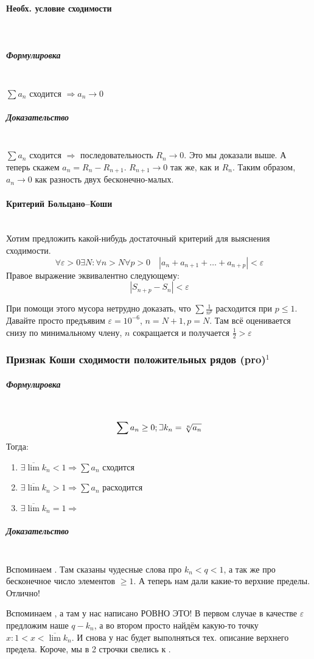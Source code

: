 \documentclass{article}
\def\letus{%
\mathord{\setbox0=\hbox{$\exists$}%
         \hbox{\kern 0.125\wd0%
               \vbox to \ht0{%
                  \hrule width 0.75\wd0%
                  \vfill%
                  \hrule width 0.75\wd0}%
               \vrule height \ht0%
               \kern 0.125\wd0}%
       }%
        }
\let\vanillaparagraph\paragraph
\let\vanillasubparagraph\subparagraph
\renewcommand{\paragraph}[1]{\vanillaparagraph{#1}\mbox{}\\}
\renewcommand{\subparagraph}[1]{\vanillasubparagraph{#1}\mbox{}\\}
\begin{document}
\paragraph{Необх. условие сходимости}
\subparagraph{Формулировка}
$\sum a_n$ сходится $\Rightarrow a_n \rightarrow 0$

\subparagraph{Доказательство}
$\sum a_n$ сходится $\Rightarrow$ последовательность $R_n \rightarrow 0$.
Это мы доказали выше. А теперь скажем $a_n = R_n - R_{n+1}$. $R_{n+1} \rightarrow 0$ так же, как и $R_n$.
Таким образом, $a_n \rightarrow 0$ как разность двух бесконечно-малых.

\paragraph{Критерий Больцано--Коши}
\label{КБК}
Хотим предложить какой-нибудь достаточный критерий для выяснения сходимости.
$$
\forall \varepsilon > 0 \exists N : \forall n > N \forall p > 0 \quad |a_n + a_{n+1} + \ldots + a_{n+p}| < \varepsilon
$$
Правое выражение эквивалентно следующему:
$$
|S_{n+p}-S_n| < \varepsilon
$$

При помощи этого мусора нетрудно доказать, что $\sum\frac{1}{n^p}$ расходится при $p \le 1$. Давайте просто предъявим $\varepsilon = 10^{-6}$, $n = N+1, p = N$. Там всё оценивается снизу по минимальному члену, $n$ сокращается и получается $\frac{1}{2} > \varepsilon$

\subsubsection{Признак Коши сходимости положительных рядов (pro)\texorpdfstring{$^1$}{}}
\subparagraph{Формулировка}
$$
\sum a_n \ge 0; \letus k_n = \sqrt[n]{a_n}
$$
Тогда:
\begin{enumerate}
    \item $\exists \overline{\lim} k_n < 1 \Rightarrow \sum a_n$ сходится
    \item $\exists \overline{\lim} k_n > 1 \Rightarrow \sum a_n$ расходится
    \item $\exists \overline{\lim} k_n = 1 \Rightarrow$ \Frowny
\end{enumerate}

\subparagraph{Доказательство}
Вспоминаем . Там сказаны чудесные слова про $k_n < q < 1$, а так же про бесконечное число элементов $\ge 1$. А теперь нам дали какие-то верхние пределы. Отлично! 

Вспоминаем , а там у нас написано РОВНО ЭТО! В первом случае в качестве $\varepsilon$ предложим наше $q - k_n$, а во втором просто найдём какую-то точку $x : 1 < x < \overline{\lim} k_n$. И снова у нас будет выполняться тех. описание верхнего предела. Короче, мы в 2 строчки свелись к .
\end{document}
